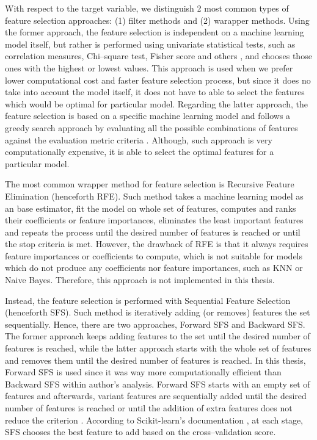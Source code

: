 With respect to the target variable, we distinguish 2 most common types of feature selection approaches: (1) filter methods and (2) warapper methods.
Using the former approach, the feature selection is independent on a machine learning model itself, but rather is performed using univariate statistical tests, such as correlation measures, Chi--square test, Fisher score and others \citep{kaushik2016introduction}, and chooses those ones with the highest or lowest values.
This approach is used when we prefer lower computational cost and faster feature selection process, but since it does no take into account the model itself, it does not have to able to select the features which would be optimal for particular model.
Regarding the latter approach, the feature selection is based on a specific machine learning model and follows a greedy search approach by evaluating all the possible combinations of features against the evaluation metric criteria \citep{Verma2020}. Although, such approach is very computationally expensive, it is able to select the optimal features for a particular model.

The most common wrapper method for feature selection is Recursive Feature Elimination (henceforth RFE). Such method takes a machine learning model as an base estimator, fit the model on whole set of features, computes and ranks their coefficients or feature importances, eliminates the least important features and repeats the process until the desired number of features is reached \citep{Brownlee2020} or until the stop criteria is met.
However, the drawback of RFE is that it always requires feature importances or coefficients to compute, which is not suitable for models which do not produce any coefficients nor feature importances, such as KNN or Naive Bayes. Therefore, this approach is not implemented in this thesis.

Instead, the feature selection is performed with Sequential Feature Selection (henceforth SFS). Such method is iteratively adding (or removes) features the set sequentially. Hence, there are two approaches, Forward SFS and Backward SFS.
The former approach keeps adding features to the set until the desired number of features is reached, while the latter approach starts with the whole set of features and removes them until the desired number of features is reached.
In this thesis, Forward SFS is used since it was way more computationally efficient than Backward SFS within author's analysis. Forward SFS starts with an empty set of features and afterwards, variant features are sequentially added until the desired number of features is reached  or until the addition of extra features does not reduce the criterion \citep{Verma2021}. 
According to Scikit-learn's documentation \citep{sfs}, at each stage, SFS chooses the best feature to add based on the cross--validation score. 
